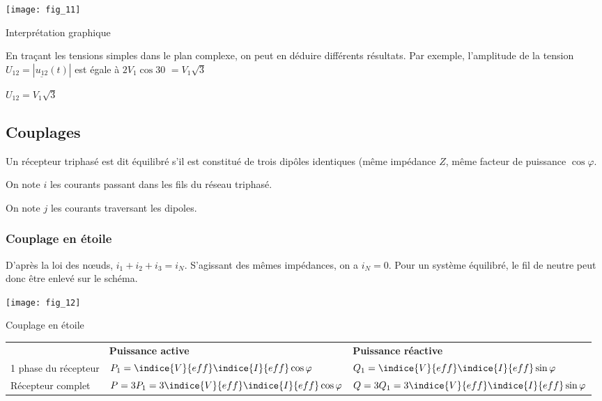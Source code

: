 \begin{marginfigure}
\centering
\texttt{[image: fig\_11]}
\caption{Interprétation graphique \label{fig:ge:cours:11}}
\end{marginfigure}

En traçant les tensions simples dans le plan complexe, on peut en déduire différents résultats. 
Par exemple, l'amplitude de la tension $U_{12}=|\underline{u_{12}}(t)|$ est égale à $2V_1\cos 30$ 
$ = {V}_{1}\sqrt{3}$ 

\begin{resultat}
$U_{12} = {V}_{1}\sqrt{3}$
\end{resultat}


\subsection{Couplages}
\begin{defi}
Un récepteur triphasé est dit équilibré s'il est constitué de trois dipôles identiques (même impédance $Z$, même facteur de puissance $\cos\varphi$.

On note $i$ les courants passant dans les fils du réseau triphasé.

On note $j$ les courants traversant les dipoles.
\end{defi}

\subsubsection{Couplage en étoile}

D'après la loi des n\oe{}uds, $i_1 + i_2 + i_3 = i_N$. S'agissant des mêmes impédances, on a $i_N=0$. Pour un système équilibré, le fil de neutre peut donc être enlevé sur le schéma.


\begin{marginfigure}
\centering
\texttt{[image: fig\_12]}
\caption{Couplage en étoile \label{fig:ge:cours:12}}
\end{marginfigure}


\begin{tabular}{lll}
\hline
& \textbf{Puissance active} & \textbf{Puissance réactive} \\ 
1 phase du récepteur & 
$P_1 = \indice{V}{eff}\indice{I}{eff} \cos \varphi$ &
$Q_1 = \indice{V}{eff}\indice{I}{eff} \sin \varphi$ \\
Récepteur complet & 
$P = 3P_1 =  3\indice{V}{eff}\indice{I}{eff} \cos \varphi$ &
$Q = 3Q_1 = 3 \indice{V}{eff}\indice{I}{eff} \sin \varphi$ \\
\hline
\end{tabular}

